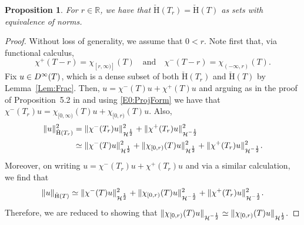 \documentclass[a4paper,10pt,reqno]{amsart}
\newcommand{\R}{\mathbb{R}}
\newcommand{\norm}[1]{\| #1 \|}%
\newcommand{\Dk}[2][{}]{{\rm D}^{#2}_{\rm #1}}%
\newcommand{\OpSobH}[2][{}]{{\mathcal{H}}^{#2}_{\rm #1}}
\newcommand{\checkH}{\check{\mathrm{H}}}
\newtheorem{proposition}[theorem]{Proposition}
\theoremstyle{definition}
\begin{document}
\begin{proposition}
\label{Prop:CheckIso}
For  $ r \in \R$, we have that $\checkH(T_r) = \checkH(T)$ as sets with equivalence of norms.
\end{proposition}
\begin{proof}
Without loss of generality, we assume that $0 < r$.
Note first that, via functional calculus,
\begin{equation}
\label{E0:ProjForm}
\chi^+(T - r) = \chi_{[r,\infty)]}(T)\quad\text{and}\quad\chi^{-}(T - r) = \chi_{(-\infty, r)}(T).
\end{equation}
Fix $u \in \Dk{\infty}(T)$, which is a dense subset of both $\checkH(T_r)$ and $\checkH(T)$ by Lemma~\ref{Lem:Frac}.
Then, $u = \chi^-(T)u + \chi^+(T)u$ and arguing as in the proof of Proposition~5.2 in \cite{BBan} and using \eqref{E0:ProjForm}  we have that $\chi^-(T_r)u = \chi_{[0,\infty)}(T) u + \chi_{[0,r)}(T) u.$
Also,
\begin{align*}
\norm{u}_{\checkH(T_r)}^2 & = \norm{\chi^{-}(T_r)u}^2_{\OpSobH{\frac{1}{2}}} + \norm{\chi^{+}(T_r)u}^2_{\OpSobH{-\frac{1}{2}}}                                                    \\
                          & \simeq \norm{\chi^-(T) u}_{\OpSobH{\frac{1}{2}}}^2 + \norm{\chi_{[0,r)}(T)u}_{\OpSobH{\frac{1}{2}}}^2 + \norm{\chi^+(T_r)u}^2_{\OpSobH{-\frac{1}{2}}}.
\end{align*}
Moreover, on writing $u = \chi^-(T_r) u + \chi^+(T_r)u$ and via a similar calculation, we find that
$$\norm{u}_{\checkH(T)} \simeq \norm{\chi^-(T)u}^2_{\OpSobH{\frac{1}{2}}} + \norm{\chi_{[0,r)}(T)u}_{\OpSobH{-\frac{1}{2}}}^2 + \norm{\chi^+(T_r)u}_{\OpSobH{-\frac{1}{2}}}^2.$$
Therefore, we are reduced to showing that $\norm{\chi_{[0,r)}(T)u}_{\OpSobH{-\frac{1}{2}}} \simeq \norm{\chi_{[0,r)}(T)u}_{\OpSobH{\frac{1}{2}}}.$


\end{proof}
\end{document}

